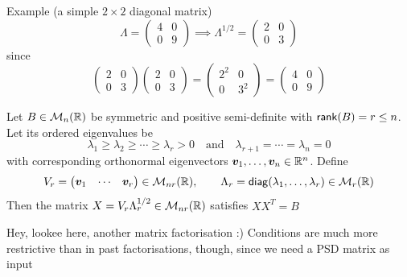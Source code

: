 \documentclass[aspectratio=169]{beamer}\usepackage[]{graphicx}\usepackage[]{xcolor}
\begin{document}
\begin{frame}{Example (a simple $2\times 2$ diagonal matrix)}
\[
\Lambda = \begin{pmatrix} 4 & 0 \\ 0 & 9 \end{pmatrix}
\implies
\Lambda^{1/2} = \begin{pmatrix} 2 & 0 \\ 0 & 3 \end{pmatrix}
\]
since
\[
\begin{pmatrix} 2 & 0 \\ 0 & 3 \end{pmatrix} \begin{pmatrix} 2 & 0 \\ 0 & 3 \end{pmatrix} = \begin{pmatrix} 2^2 & 0 \\ 0 & 3^2 \end{pmatrix} = \begin{pmatrix} 4 & 0 \\ 0 & 9 \end{pmatrix}
\]
\end{frame}

\begin{frame}
\begin{theorem}
\label{th:psd_is_gram}
Let $B\in\mathcal{M}_n(\mathbb{R})$ be symmetric and positive semi-definite with $\mathsf{rank}(B) = r \le n$. Let its ordered eigenvalues be
\[
\lambda_1 \ge \lambda_2 \ge \cdots \ge \lambda_r > 0 \quad\text{and}\quad \lambda_{r+1} = \cdots = \lambda_n = 0
\]
with corresponding orthonormal eigenvectors $\bm{v}_1,\ldots,\bm{v}_n\in\mathbb{R}^n$. Define
\[
V_r = \begin{pmatrix} \bm{v}_1 & \cdots & \bm{v}_r \end{pmatrix} \in \mathcal{M}_{nr}(\mathbb{R}), \qquad
\Lambda_r = \mathsf{diag}(\lambda_1,\ldots,\lambda_r) \in \mathcal{M}_r(\mathbb{R})
\]
Then the matrix $X = V_r \Lambda_r^{1/2} \in \mathcal{M}_{nr}(\mathbb{R})$ satisfies $XX^T = B$
\end{theorem}
\vfill
Hey, lookee here, another matrix factorisation :) Conditions are much more restrictive than in past factorisations, though, since we need a PSD matrix as input
\end{frame}


\end{document}
